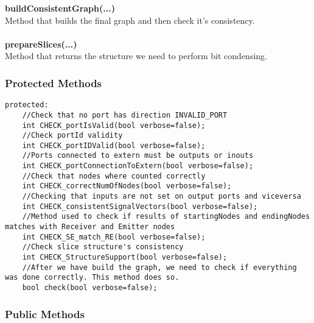 \documentclass{article}
\begin{document}
\textbf{buildConsistentGraph(...)}\\
Method that builds the final graph and then check it's consistency.\\\\

\textbf{prepareSlices(...)}\\
Method that returns the structure we need to perform bit condensing.

\subsubsection{Protected Methods}

\begin{mdframed}[hidealllines=true, backgroundcolor=magenta!10]
	\begin{lstlisting}[basicstyle=\tiny]
	protected:
	//Check that no port has direction INVALID_PORT
	int CHECK_portIsValid(bool verbose=false);
	//Check portId validity
	int CHECK_portIDValid(bool verbose=false);
	//Ports connected to extern must be outputs or inouts
	int CHECK_portConnectionToExtern(bool verbose=false);
	//Check that nodes where counted correctly
	int CHECK_correctNumOfNodes(bool verbose=false);
	//Checking that inputs are not set on output ports and viceversa
	int CHECK_consistentSignalVectors(bool verbose=false);
	//Method used to check if results of startingNodes and endingNodes matches with Receiver and Emitter nodes
	int CHECK_SE_match_RE(bool verbose=false);
	//Check slice structure's consistency
	int CHECK_StructureSupport(bool verbose=false);
	//After we have build the graph, we need to check if everything was done correctly. This method does so.
	bool check(bool verbose=false);
	\end{lstlisting}
\end{mdframed}

\subsubsection{Public Methods}
\end{document}

